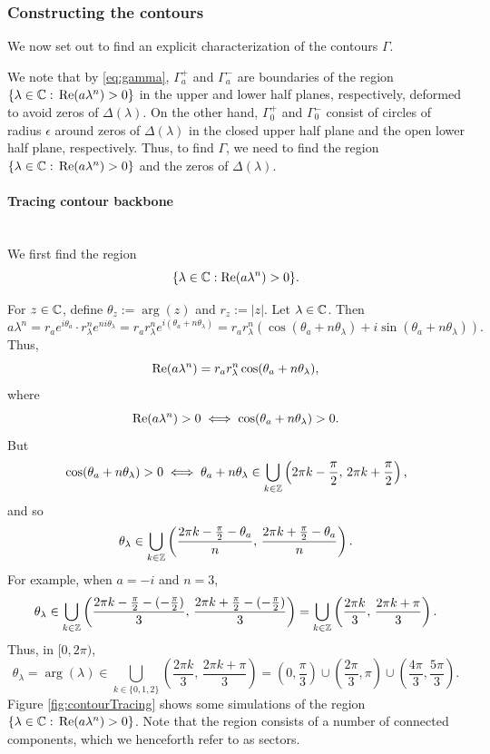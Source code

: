 \documentclass[12pt, oneside, a4paper]{article}
\begin{document}
\subsubsection{Constructing the contours}\label{sec:constructing_contours}

We now set out to find an explicit characterization of the contours $\Gamma$.

We note that by \eqref{eq:gamma}, $\Gamma_a^+$ and $\Gamma_a^-$ are boundaries of the region $\{\lambda\in\mathbb C:\, \mathrm{Re}(a\lambda^n)>0\}$ in the upper and lower half planes, respectively, deformed to avoid zeros of $\Delta(\lambda)$. On the other hand, $\Gamma_0^+$ and $\Gamma_0^-$ consist of circles of radius $\epsilon$ around zeros of $\Delta(\lambda)$ in the closed upper half plane and the open lower half plane, respectively. Thus, to find $\Gamma$, we need to find the region $\{\lambda\in\mathbb C:\, \mathrm{Re}(a\lambda^n)>0\}$ and the zeros of $\Delta(\lambda)$.

\paragraph{Tracing contour backbone}\mbox{}\label{par:tracing_contour_sectors}\\
We first find the region
\[\{\lambda\in\mathbb C: \mathrm{Re}(a\lambda^n)>0\}.\]

For $z\in\mathbb C$, define $\theta_z:=\arg(z)$ and $r_z:=|z|$.
Let $\lambda\in\mathbb C$. Then
\[a\lambda^n = r_ae^{i\theta_a}\cdot r_\lambda^n e^{ni\theta_\lambda} = r_a r_\lambda^n e^{i(\theta_a+n\theta_\lambda)} = r_ar_\lambda^n(\cos(\theta_a+n\theta_\lambda) + i\sin(\theta_a+n\theta_\lambda)).\]
Thus,
\[\mathrm{Re}(a\lambda^n) = r_ar_\lambda^n \cos(\theta_a+n\theta_\lambda),\]
where
\[\mathrm{Re}(a\lambda^n)>0 \iff \cos(\theta_a+n\theta_\lambda)>0.\]
But
\[\cos(\theta_a+n\theta_\lambda)>0 \iff \theta_a+n\theta_\lambda\in \bigcup_{k\in\mathbb Z}\left(2\pi k -\frac{\pi}{2},\,2\pi k + \frac{\pi}{2}\right),\]
and so
\[\theta_\lambda\in \bigcup_{k\in\mathbb Z}\left(\frac{2\pi k -\frac{\pi}{2}-\theta_a}{n},\,\frac{2\pi k + \frac{\pi}{2}-\theta_a}{n}\right).\]
For example, when $a=-i$ and $n=3$,
\[\theta_\lambda\in \bigcup_{k\in\mathbb Z}\left(\frac{2\pi k -\frac{\pi}{2}-(-\frac{\pi}{2})}{3},\,\frac{2\pi k + \frac{\pi}{2}-(-\frac{\pi}{2})}{3}\right) = \bigcup_{k\in\mathbb Z}\left(\frac{2\pi k}{3},\,\frac{2\pi k + \pi}{3}\right).\]
Thus, in $[0,2\pi)$,
\[\theta_\lambda=\arg(\lambda)\in \bigcup_{k\in\{0,1,2\}}\left(\frac{2\pi k}{3},\,\frac{2\pi k + \pi}{3}\right) = \left(0,\frac{\pi}{3}\right)\cup \left(\frac{2\pi}{3}, \pi\right)\cup \left(\frac{4\pi}{3}, \frac{5\pi}{3}\right).\]
Figure \ref{fig:contourTracing} shows some simulations of the region $\{\lambda\in\mathbb C:\,\mathrm{Re}(a\lambda^n)>0\}$. Note that the region consists of a number of connected components, which we henceforth refer to as sectors.
\end{document}
